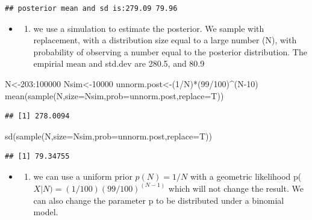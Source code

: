 \documentclass[
]{book}
\newenvironment{Shaded}{\begin{snugshade}}{\end{snugshade}}
\newcommand{\AttributeTok}[1]{\textcolor[rgb]{0.77,0.63,0.00}{#1}}
\newcommand{\DecValTok}[1]{\textcolor[rgb]{0.00,0.00,0.81}{#1}}
\newcommand{\FunctionTok}[1]{\textcolor[rgb]{0.00,0.00,0.00}{#1}}
\newcommand{\NormalTok}[1]{#1}
\newcommand{\OtherTok}[1]{\textcolor[rgb]{0.56,0.35,0.01}{#1}}
\newcommand{\SpecialCharTok}[1]{\textcolor[rgb]{0.00,0.00,0.00}{#1}}
\providecommand{\tightlist}{%
  \setlength{\itemsep}{0pt}\setlength{\parskip}{0pt}}
\theoremstyle{definition}
\theoremstyle{definition}
\theoremstyle{definition}
\theoremstyle{definition}
\theoremstyle{remark}
\begin{document}
\begin{verbatim}
## posterior mean and sd is:279.09 79.96
\end{verbatim}

\begin{itemize}
\item
  \begin{enumerate}
  \def\labelenumi{(\alph{enumi})}
  \setcounter{enumi}{1}
  \tightlist
  \item
    we use a simulation to estimate the posterior. We sample with replacement, with a distribution size equal to a large number (N), with probability of observing a number equal to the posterior distribution. The empirial mean and std.dev are 280.5, and 80.9
  \end{enumerate}
\end{itemize}

\begin{Shaded}
\begin{Highlighting}[]
\NormalTok{ N}\OtherTok{\textless{}{-}}\DecValTok{203}\SpecialCharTok{:}\DecValTok{100000}
\NormalTok{ Nsim}\OtherTok{\textless{}{-}}\DecValTok{10000}
\NormalTok{ unnorm.post}\OtherTok{\textless{}{-}}\NormalTok{(}\DecValTok{1}\SpecialCharTok{/}\NormalTok{N)}\SpecialCharTok{*}\NormalTok{(}\DecValTok{99}\SpecialCharTok{/}\DecValTok{100}\NormalTok{)}\SpecialCharTok{\^{}}\NormalTok{(N}\DecValTok{{-}10}\NormalTok{)}
 \FunctionTok{mean}\NormalTok{(}\FunctionTok{sample}\NormalTok{(N,}\AttributeTok{size=}\NormalTok{Nsim,}\AttributeTok{prob=}\NormalTok{unnorm.post,}\AttributeTok{replace=}\NormalTok{T))}
\end{Highlighting}
\end{Shaded}

\begin{verbatim}
## [1] 278.0094
\end{verbatim}

\begin{Shaded}
\begin{Highlighting}[]
 \FunctionTok{sd}\NormalTok{(}\FunctionTok{sample}\NormalTok{(N,}\AttributeTok{size=}\NormalTok{Nsim,}\AttributeTok{prob=}\NormalTok{unnorm.post,}\AttributeTok{replace=}\NormalTok{T))}
\end{Highlighting}
\end{Shaded}

\begin{verbatim}
## [1] 79.34755
\end{verbatim}

\begin{itemize}
\item
  \begin{enumerate}
  \def\labelenumi{(\alph{enumi})}
  \setcounter{enumi}{2}
  \tightlist
  \item
    we can use a uniform prior \(p(N) = 1/N\) with a geometric likelihood p(\(X|N)=(1/100)(99/100)^(N-1)\) which will not change the result. We can also change the parameter p to be distributed under a binomial model.
  \end{enumerate}
\end{itemize}
\end{document}
